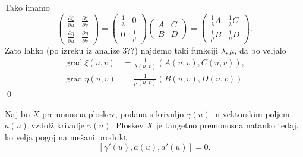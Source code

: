 Tako imamo \begin{equation*}
  \begin{pmatrix}
    \frac{ \partial \xi }{ \partial u }  & \frac{ \partial \xi }{ \partial v }  \\
    \frac{ \partial \eta }{ \partial u }  & \frac{ \partial \eta }{ \partial v } 
    \end{pmatrix} = \begin{pmatrix}
      \frac{1}{\lambda} & 0  \\ 0 & \frac{1}{\mu} 
      \end{pmatrix}\begin{pmatrix}
      A & C \\
      B & D
      \end{pmatrix} = \begin{pmatrix}
        \frac{1}{\lambda} A & \frac{1}{\lambda} C \\
        \frac{1}{\mu} B & \frac{1}{\mu} D
        \end{pmatrix}.
\end{equation*}  
Zato lahko (po izreku iz analize 3??) %
najdemo taki funkciji $\lambda, \mu$, da bo veljalo \begin{align*}
  \operatorname{grad} \xi (u,v) &= \frac{1}{\lambda(u,v)}(A(u,v), C(u,v)), \\
  \operatorname{grad} \eta (u,v) &= \frac{1}{\mu(u,v)}(B(u,v), D(u,v)).
\end{align*}
\qed

\begin{lema}
Naj bo $X$ premonosna %
ploskev, podana s krivuljo $\gamma(u)$ in vektorskim poljem $a(u)$ vzdolž krivulje $\gamma(u)$. Ploskev $X$ je
tangetno premonosna natanko tedaj, ko velja pogoj na mešani produkt \begin{equation*}
\left[ \gamma'(u), a(u), a'(u) \right] = 0.
\end{equation*}  
\noindent
\end{lema}

